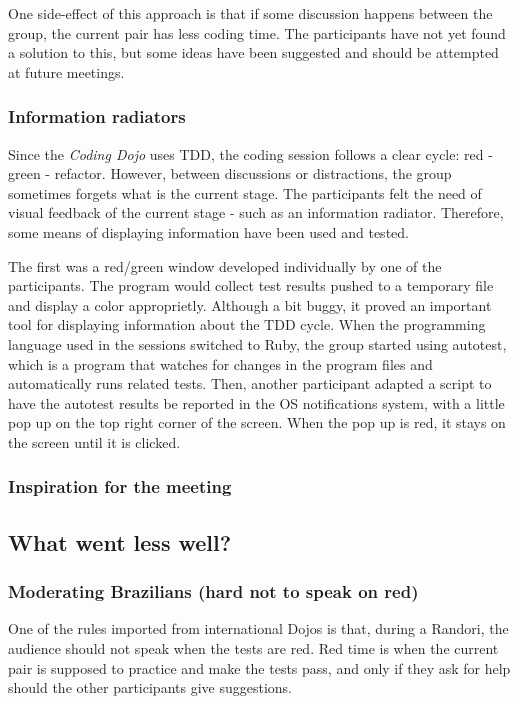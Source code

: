 One side-effect of this approach is that if some discussion happens
between the group, the current pair has less coding time. The
participants have not yet found a solution to this, but some ideas
have been suggested and should be attempted at future meetings.

\subsubsection{Information radiators}

Since the \emph{Coding Dojo} uses TDD, the coding session follows a
clear cycle: red - green - refactor. However, between discussions or
distractions, the group sometimes forgets what is the current
stage. The participants felt the need of visual feedback of the
current stage - such as an information radiator. Therefore, some means
of displaying information have been used and tested.

The first was a red/green window developed individually by one of the
participants. The program would collect test results pushed to a
temporary file and display a color approprietly. Although a bit buggy,
it proved an important tool for displaying information about the TDD
cycle. When the programming language used in the sessions switched to
Ruby, the group started using autotest, which is a program that
watches for changes in the program files and automatically runs
related tests. Then, another participant adapted a script to have the
autotest results be reported in the OS notifications system, with a
little pop up on the top right corner of the screen. When the pop up
is red, it stays on the screen until it is clicked. 

\subsubsection{Inspiration for the meeting}

\subsection{What went less well?}\label{ssub:less_well}

\subsubsection{Moderating Brazilians (hard not to speak on red)}

One of the rules imported from international Dojos is that, during a
Randori, the audience should not speak when the tests are red. Red
time is when the current pair is supposed to practice and make the
tests pass, and only if they ask for help should the other
participants give suggestions.

